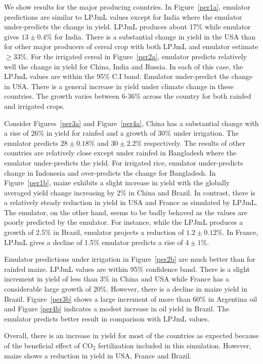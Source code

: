 We show results for the major producing countries. In Figure~\ref{per1a}, emulator predictions are similar to LPJmL values except for India where the emulator under-predicts the change in yield. LPJmL produces about 17\% while emulator gives $13\pm 0.4\%$ for India. There is a substantial change in yield in the USA than for other major producers of cereal crop with both LPJmL and emulator estimate $\ge33\%$. 
For the irrigated cereal in Figure~\ref{per2a}, emulator predicts relatively well the change in yield for China, India and Russia. In each of this case, the LPJmL values are within the 95\% C.I band. Emulator under-predict the change in USA. There is a general increase in yield under climate change in these countries. The growth varies between 6-36\% across the country for both rainfed and irrigated crops. 

Consider Figures~\ref{per3a} and Figure~\ref{per4a}, China has a substantial change with a rise of 26\% in yield for rainfed and a growth of 30\% under irrigation. The emulator predicts $28\pm 0.18\%$ and $30\pm 2.2\%$ respectively. The results of other countries are relatively close except under rainfed in Bangladesh where the emulator under-predicts the yield. For irrigated rice, emulator under-predicts change in Indonesia and over-predicts the change for Bangladesh.
In Figure~\ref{per1b}, maize exhibits a slight increase in yield with the globally averaged yield change increasing
by 2\% in China and Brazil. In contrast, there is a relatively steady reduction in yield in USA and France as simulated by LPJmL. The emulator, on the other hand, seems to be badly behaved as the values are poorly predicted by the emulator. For instance, while the LPJmL produces a growth of 2.5\% in Brazil, emulator projects a reduction of $1.2\pm0.12\%$. In France, LPJmL gives a decline of 1.5\% emulator predicts a rise of $4\pm1\%$.

Emulator predictions under irrigation in Figure~\ref{per2b} are much better than for rainfed maize. LPJmL values are within 95\% confidence band. There is a slight increment in yield of less than 3\% in China and USA while France has a considerable large growth of 20\%. However, there is a decline in maize yield in Brazil. Figure~\ref{per3b} shows a large increment of more than 60\% in Argentina oil and Figure \ref{per4b} indicates a modest increase in oil yield in Brazil. The emulator predicts better result in comparison with LPJmL values.

Overall, there is an increase in yield for most of the countries as expected because of the beneficial effect of CO$_2$ fertilization included in this simulation. However, maize shows a reduction in yield in USA, France and Brazil.


